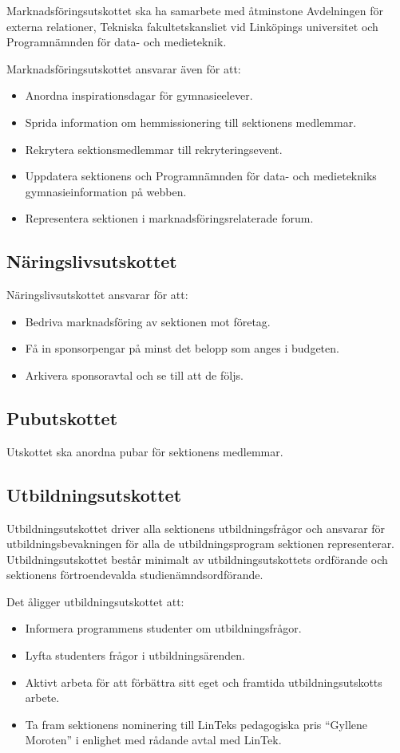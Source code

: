 \documentclass{datateknologsektionen-document}
\begin{document}
Marknadsföringsutskottet ska ha samarbete med åtminstone Avdelningen för externa relationer,
Tekniska fakultetskansliet vid Linköpings universitet och Programnämnden för data- och medieteknik.

Marknadsföringsutskottet ansvarar även för att:
\begin{itemize}
  \item Anordna inspirationsdagar för gymnasieelever.
  \item Sprida information om hemmissionering till sektionens medlemmar.
  \item Rekrytera sektionsmedlemmar till rekryteringsevent.
  \item Uppdatera sektionens och Programnämnden för data- och medietekniks gymnasieinformation på webben.
  \item Representera sektionen i marknadsföringsrelaterade forum.
\end{itemize}

\subsection{Näringslivsutskottet}
Näringslivsutskottet ansvarar för att:
\begin{itemize}
  \item Bedriva marknadsföring av sektionen mot företag.
  \item Få in sponsorpengar på minst det belopp som anges i budgeten.
  \item Arkivera sponsoravtal och se till att de följs.
\end{itemize}

\subsection{Pubutskottet}
Utskottet ska anordna pubar för sektionens medlemmar.

\subsection{Utbildningsutskottet}
Utbildningsutskottet driver alla sektionens utbildningsfrågor och ansvarar för
utbildningsbevakningen för alla de utbildningsprogram sektionen representerar.
Utbildningsutskottet består minimalt av utbildningsutskottets ordförande och
sektionens förtroendevalda studienämndsordförande.

Det åligger utbildningsutskottet att:
\begin{itemize}
  \item Informera programmens studenter om utbildningsfrågor.
  \item Lyfta studenters frågor i utbildningsärenden.
  \item Aktivt arbeta för att förbättra sitt eget och framtida utbildningsutskotts arbete.
  \item Ta fram sektionens nominering till LinTeks pedagogiska pris ``Gyllene Moroten'' i enlighet med rådande avtal med LinTek.
\end{itemize}
\end{document}
